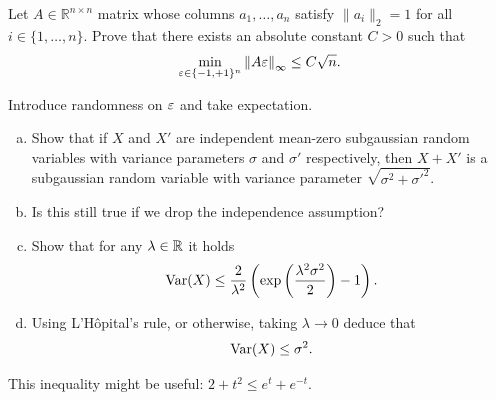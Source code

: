 \begin{myexercise}
    \label{prob:komlos_weak}
    Let $A\in \mathbb{R}^{n \times n}$ matrix whose columns $a_1, \ldots, a_n$ satisfy $\|a_i\|_{2} = 1$ for all $i \in \{1, \ldots, n\}$. Prove that there exists an absolute constant $C>0$ such that
    \begin{equation*}
        \min_{\varepsilon \in \{-1,+1\}^n}{\left\lVert{A\varepsilon}\right\rVert}_{\infty} \leq C\sqrt{n}.
    \end{equation*}
\end{myexercise}
\begin{hint}
    Introduce randomness on $\varepsilon$ and take expectation.
\end{hint}

\begin{myexercise}
    \label{prob:subgaussian_properties}
    \begin{enumerate}[(a)]
        \item Show that if $X$ and $X'$ are independent mean-zero subgaussian random variables with variance parameters $\sigma$ and $\sigma'$ respectively, then $X + X'$ is a subgaussian random variable with variance parameter $\sqrt{\sigma^2 + \sigma'^2}$.

        \item Is this still true if we drop the independence assumption?

        \item Show that for any $\lambda \in \mathbb{R}$ it holds
        \begin{equation*}
            \operatorname{Var}(X) \leq \frac{2}{\lambda^2}\left( \exp\left( \frac{\lambda^2 \sigma^2}{2} \right)-1 \right).
        \end{equation*}

        \item Using L'Hôpital's rule, or otherwise, taking $\lambda \to 0$ deduce that
        \begin{equation*}
            \operatorname{Var}(X) \leq \sigma^2.
        \end{equation*}
    \end{enumerate} 
\end{myexercise}
\begin{hint}
    This inequality might be useful: $2 + t^2 \leq e^{t} + e^{-t}$.
\end{hint}

